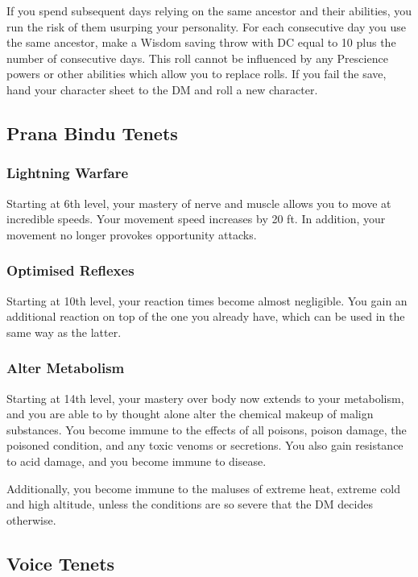 If you spend subsequent days relying on the same ancestor
and their abilities,
you run the risk of them usurping your personality.
For each consecutive day you use the same ancestor,
make a Wisdom saving throw with DC equal to 10 plus the number
of consecutive days.
This roll cannot be influenced by any Prescience powers
or other abilities which allow you to replace rolls.
If you fail the save,
hand your character sheet to the DM and roll a new character.

\subsection{Prana Bindu Tenets}
\label{sub:prana_bindu_tenets}

\subsubsection{Lightning Warfare}
Starting at 6th level,
your mastery of nerve and muscle
allows you to move at incredible speeds.
Your movement speed increases by 20 ft.
In addition, your movement no longer provokes
opportunity attacks.

\subsubsection{Optimised Reflexes}
Starting at 10th level,
your reaction times become almost negligible.
You gain an additional reaction on top of the one
you already have, which can be used in the same way
as the latter.

\subsubsection{Alter Metabolism}
Starting at 14th level,
your mastery over body now extends to your metabolism,
and you are able to by thought alone
alter the chemical makeup of malign substances.
You become immune to the effects of all poisons,
poison damage, the poisoned condition, and any toxic venoms
or secretions.
You also gain resistance to acid damage,
and you become immune to disease.

Additionally, you become immune to the maluses of extreme heat,
extreme cold and high altitude,
unless the conditions are so severe
that the DM decides otherwise.

\subsection{Voice Tenets}

